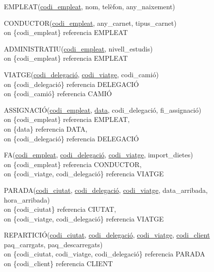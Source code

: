 \documentclass[a4paper,12pt]{article}
\begin{document}
EMPLEAT(\underline{codi\_empleat}, nom, telèfon, any\_naixement)

CONDUCTOR(\underline{codi\_empleat}, any\_carnet, tipus\_carnet) \\
on \{codi\_empleat\} referencia EMPLEAT

ADMINISTRATIU(\underline{codi\_empleat}, nivell\_estudis) \\
on \{codi\_empleat\} referencia EMPLEAT

VIATGE(\underline{codi\_delegació}, \underline{codi\_viatge}, codi\_camió) \\
on \{codi\_delegació\} referencia DELEGACIÓ \\ 
on \{codi\_camió\} referencia CAMIÓ

ASSIGNACIÓ(\underline{codi\_empleat}, \underline{data}, codi\_delegació, fi\_assignació) \\
on \{codi\_empleat\} referencia EMPLEAT, \\
on \{data\} referencia DATA, \\
on \{codi\_delegació\} referencia DELEGACIÓ

FA(\underline{codi\_empleat}, \underline{codi\_delegació}, \underline{codi\_viatge}, import\_dietes) \\
on \{codi\_empleat\} referencia CONDUCTOR, \\
on \{codi\_viatge, codi\_delegació\} referencia VIATGE

PARADA(\underline{codi\_ciutat}, \underline{codi\_delegació}, \underline{codi\_viatge}, data\_arribada, hora\_arribada) \\
on \{codi\_ciutat\} referencia CIUTAT, \\
on \{codi\_viatge, codi\_delegació\} referencia VIATGE

REPARTICIÓ(\underline{codi\_ciutat}, \underline{codi\_delegació}, \underline{codi\_viatge}, \underline{codi\_client} paq\_carrgats, paq\_descarregats) \\
on \{codi\_ciutat, codi\_viatge, codi\_delegació\} referencia PARADA \\
on \{codi\_client\} referencia CLIENT
\end{document}
